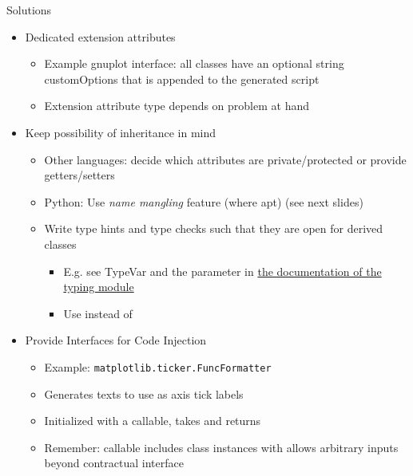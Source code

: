 \begin{frame}{Solutions}
%
\begin{itemize}
\item Dedicated extension attributes
	\begin{itemize}
	\item Example gnuplot interface: all classes have an optional string customOptions that is appended to the generated script
	\item Extension attribute type depends on problem at hand
	\end{itemize}
	\pause
\item Keep possibility of inheritance in mind
	\begin{itemize}
	\item Other languages: decide which attributes are private/protected or provide getters/setters
	\item Python: Use \emph{name mangling} feature (where apt) (see next slides)
	\item Write type hints and type checks such that they are open for derived classes
		\begin{itemize}
		\item E.\;g. see TypeVar and the parameter in \href{https://docs.python.org/3/library/typing.html}{\thus the documentation of the typing module}
		\item Use  instead of  
		\end{itemize}
	\end{itemize}
	\pause
\item Provide Interfaces for Code Injection
	\begin{itemize}
	\item Example: \texttt{matplotlib.ticker.FuncFormatter}
	\item Generates texts to use as axis tick labels
	\item Initialized with a callable, takes  and returns 
	\item Remember: callable includes class instances with  \Thus allows arbitrary inputs beyond contractual interface
	\end{itemize}
\end{itemize}
%
\end{frame}


